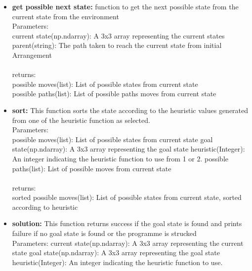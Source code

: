\documentclass[conference]{IEEEtran}
\begin{document}
\begin{itemize}
\\
     \item \textbf{get possible next state:}
function to get the next possible state from the current state from the environment
\\
Parameters:
\\
current state(np.ndarray): A 3x3 array representing the current states
parent(string): The path taken to reach the current state
from initial Arrangement
\\
\\
returns:
\\
possible moves(list): List of possible states from current state
\\
possible paths(list): List of possible paths moves from current state
\\
       \item \textbf{sort:}
This function sorts the state according to the heuristic values generated from one of the heuristic function as selected.
\\
Parameters:
\\
possible moves(list): List of possible states from current state
goal state(np.ndarray): A 3x3  array representing the goal state
heuristic(Integer): An integer indicating the heuristic
function to use from 1 or 2.
possible paths(list): List of possible moves from current state
\\
\\
returns:
\\
sorted possible moves(list): List of possible states from current state, sorted according to heuristic
\\
      \item \textbf{solution:}
This function returns success if the goal state is found and prints failure if no goal state is found or the programme is strucked
\\
Parameters:
current state(np.ndarray): A 3x3 array representing the current state
goal state(np.ndarray): A 3x3 array representing the goal state
heuristic(Integer): An integer indicating the heuristic
function to use.
\\
\\
\end{itemize}
\end{document}
